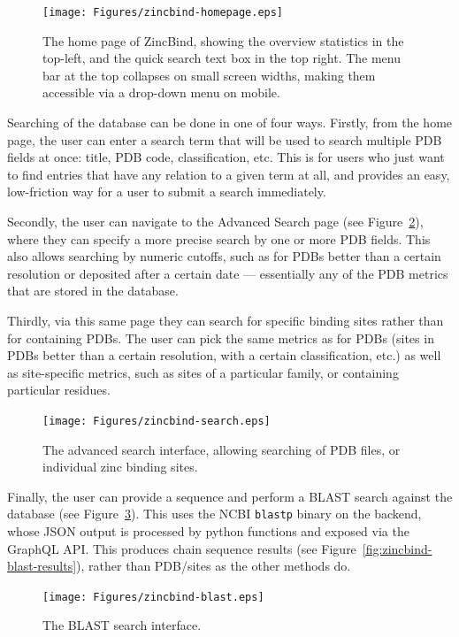 \begin{figure}
\centering
\texttt{[image: Figures/zincbind-homepage.eps]}
\caption[The home page of ZincBind.]{\label{fig:zincbind-homepage} The home page of ZincBind, showing the
overview statistics in the top-left, and the quick search text box in the top right.
The menu bar at the top collapses on small screen widths, making them accessible via a
drop-down menu on mobile.}
\end{figure}

Searching of the database can be done in one of four ways. Firstly, from the home page, the user can enter a search term that will be used to search multiple PDB fields at once: title, PDB code, classification, etc. This is for users who just want to find entries that have any relation to a given term at all, and provides an easy, low-friction way for a user to submit a search immediately.

Secondly, the user can navigate to the Advanced Search page (see Figure~\ref{fig:zincbind-search}), where they can specify a more precise search by one or more PDB fields. This also allows searching by numeric cutoffs, such as for PDBs better than a certain resolution or deposited after a certain date --- essentially any of the PDB metrics that are stored in the database.

Thirdly, via this same page they can search for specific binding sites rather than for containing PDBs. The user can pick the same metrics as for PDBs (sites in PDBs better than a certain resolution, with a certain classification, etc.) as well as site-specific metrics, such as sites of a particular family, or containing particular residues.

\begin{figure}
\centering
\texttt{[image: Figures/zincbind-search.eps]}
\caption[The advanced search interface.]{\label{fig:zincbind-search} The advanced search interface, allowing searching of
PDB files, or individual zinc binding sites.}
\end{figure}

Finally, the user can provide a sequence and perform a BLAST search against the database (see Figure~\ref{fig:zincbind-blast}). This uses the NCBI \texttt{blastp} binary on the backend, whose JSON output is processed by python functions and exposed via the GraphQL API. This produces chain sequence results (see Figure~\ref{fig:zincbind-blast-results}), rather than PDB/sites as the other methods do.

\begin{figure}
\centering
\texttt{[image: Figures/zincbind-blast.eps]}
\caption{\label{fig:zincbind-blast} The BLAST search interface.}
\end{figure}

